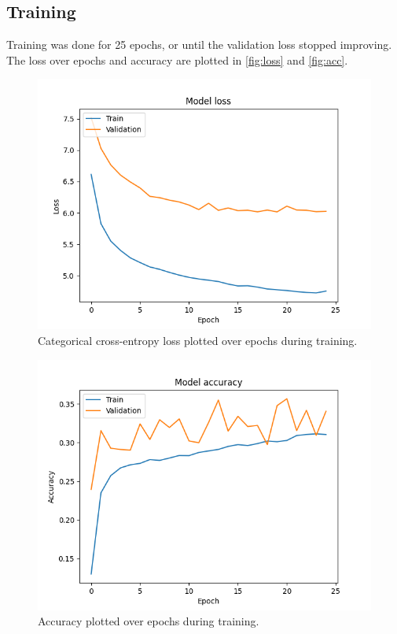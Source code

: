 \documentclass[11pt, twocolumn]{article}
\begin{document}
\subsection{Training}
Training was done for 25 epochs, or until the validation loss stopped improving. The loss over epochs and accuracy are plotted in \autoref{fig:loss} and \autoref{fig:acc}.
\begin{figure}
    \includegraphics[width=\linewidth]{images/loss_bach_big_categorical_crossentropy_Nadam_sigmoid_n86_tps8_ws96.png}
    \caption{Categorical cross-entropy loss plotted over epochs during training.}
    \label{fig:loss}
\end{figure}
\begin{figure}
    \includegraphics[width=\linewidth]{images/acc_bach_big_categorical_crossentropy_Nadam_sigmoid_n86_tps8_ws96.png}
    \caption{Accuracy plotted over epochs during training.}
    \label{fig:acc}
\end{figure}
\end{document}
